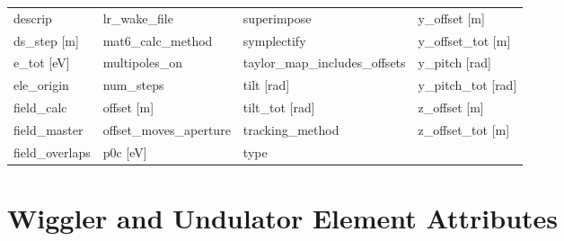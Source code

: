\begin{tabular}{llll}
descrip                          & lr_wake_file                     & superimpose                      & y_offset [m]                     \\
ds_step [m]                      & mat6_calc_method                 & symplectify                      & y_offset_tot [m]                 \\
e_tot [eV]                       & multipoles_on                    & taylor_map_includes_offsets      & y_pitch [rad]                    \\
ele_origin                       & num_steps                        & tilt [rad]                       & y_pitch_tot [rad]                \\
field_calc                       & offset [m]                       & tilt_tot [rad]                   & z_offset [m]                     \\
field_master                     & offset_moves_aperture            & tracking_method                  & z_offset_tot [m]                 \\
field_overlaps                   & p0c [eV]                         & type                             &                                  \\
 \bottomrule
 \end{tabular}
 \vfill
 
 \section{Wiggler and Undulator Element Attributes}
 \label{s:list.wiggler}
 
